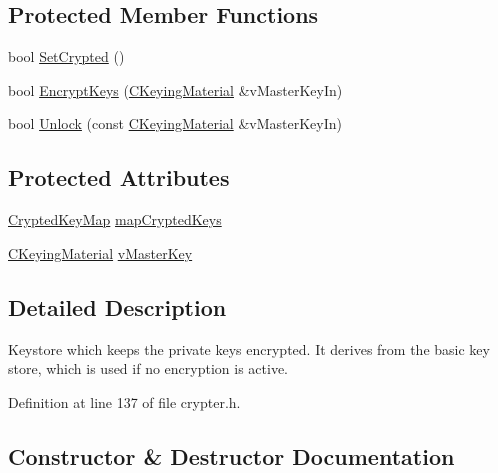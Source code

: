 \subsection*{Protected Member Functions}
\begin{DoxyCompactItemize}
\item 
bool \hyperlink{class_c_crypto_key_store_af202f587051735be5a39344d9e333720}{Set\+Crypted} ()
\item 
bool \hyperlink{class_c_crypto_key_store_a8c0f6b63fb04193df16243c4459b7c61}{Encrypt\+Keys} (\hyperlink{crypter_8h_a64709c9a3acc8f5694515789a183ad7b}{C\+Keying\+Material} \&v\+Master\+Key\+In)
\item 
bool \hyperlink{class_c_crypto_key_store_a81bd70e18aa75f566526620a74f9cd88}{Unlock} (const \hyperlink{crypter_8h_a64709c9a3acc8f5694515789a183ad7b}{C\+Keying\+Material} \&v\+Master\+Key\+In)
\end{DoxyCompactItemize}
\subsection*{Protected Attributes}
\begin{DoxyCompactItemize}
\item 
\hyperlink{keystore_8h_a6c476ecc6771e6bf6bf022a735216a27}{Crypted\+Key\+Map} \hyperlink{class_c_crypto_key_store_ad1fb9b23eee7a352617209ee2e4f3498}{map\+Crypted\+Keys}
\item 
\hyperlink{crypter_8h_a64709c9a3acc8f5694515789a183ad7b}{C\+Keying\+Material} \hyperlink{class_c_crypto_key_store_ac74e458a90ce17a95e238bad724df3fd}{v\+Master\+Key}
\end{DoxyCompactItemize}


\subsection{Detailed Description}
Keystore which keeps the private keys encrypted. It derives from the basic key store, which is used if no encryption is active. 

Definition at line 137 of file crypter.\+h.



\subsection{Constructor \& Destructor Documentation}
\hypertarget{class_c_crypto_key_store_a7c7f1075182d42fcb0781d1dc7a876c3}{}
